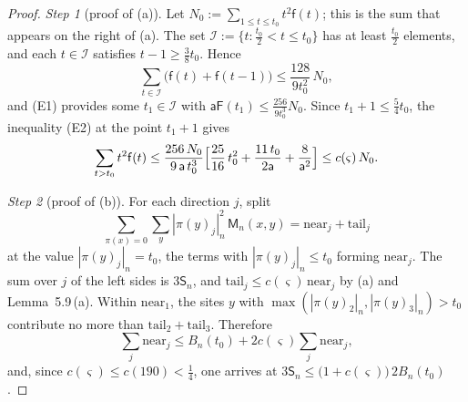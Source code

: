 \documentclass[11pt]{amsart}
\theoremstyle{definition}
\begin{document}
\begin{proof}
\emph{Step 1} (proof of (a)).
Let $N_0:=\sum_{1\le t\le t_0}t^2\mathsf f(t)$; this is the sum that appears on the right of (a).
The set $\mathcal I:=\{t:\frac{t_0}2<t\le t_0\}$ has at least $\frac{t_0}2$ elements, and each $t\in\mathcal I$ satisfies $t-1\ge\frac38t_0$.
Hence
\begin{equation*}
\sum_{t\in\mathcal I}\bigl(\mathsf f(t)+\mathsf f(t-1)\bigr)\le\frac{128}{9t_0^2}\,N_0,
\end{equation*}
and (E1) provides some $t_1\in\mathcal I$ with $\mathsf a\mathsf F(t_1)\le\frac{256}{9t_0^3}N_0$.
Since $t_1+1\le\frac54t_0$, the inequality (E2) at the point $t_1+1$ gives
\begin{equation*}
\sum_{t>t_0}t^2\mathsf f(t)\le\frac{256\,N_0}{9\,\mathsf a\,t_0^3}\Bigl[\frac{25}{16}\,t_0^2+\frac{11\,t_0}{2\mathsf a}+\frac{8}{\mathsf a^2}\Bigr]\le c(\varsigma)\,N_0.
\end{equation*}

\emph{Step 2} (proof of (b)).
For each direction $j$, split
\begin{equation*}
\sum_{\pi(x)=0}\sum_y|\pi(y)_j|_n^2\,\mathsf M_n(x,y)=\mathrm{near}_j+\mathrm{tail}_j
\end{equation*}
at the value $|\pi(y)_j|_n=t_0$, the terms with $|\pi(y)_j|_n\le t_0$ forming $\mathrm{near}_j$.
The sum over $j$ of the left sides is $3\mathsf S_n$, and $\mathrm{tail}_j\le c(\varsigma)\,\mathrm{near}_j$ by (a) and Lemma~5.9\,(a).
Within $\mathrm{near}_1$, the sites $y$ with $\max(|\pi(y)_2|_n,|\pi(y)_3|_n)>t_0$ contribute no more than $\mathrm{tail}_2+\mathrm{tail}_3$.
Therefore
\begin{equation*}
\sum_j\mathrm{near}_j\le B_n(t_0)+2c(\varsigma)\sum_j\mathrm{near}_j,
\end{equation*}
and, since $c(\varsigma)\le c(190)<\frac14$, one arrives at $3\mathsf S_n\le\bigl(1+c(\varsigma)\bigr)\,2B_n(t_0)$.


\end{proof}
\end{document}
